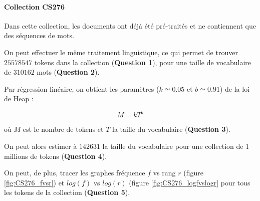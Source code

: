 \documentclass[12pt,a4paper]{article}
\begin{document}
\paragraph{Collection CS276} Dans cette collection, les documents ont déjà été pré-traités et ne contiennent que des séquences de mots.

On peut effectuer le même traitement linguistique, ce qui permet de trouver $25578547$ tokens dans la collection (\textbf{Question 1}), pour une taille de vocabulaire de $310162$ mots (\textbf{Question 2}).

Par régression linéaire, on obtient les paramètres ($k \simeq 0.05$ et $b \simeq 0.91$) de la loi de Heap :

\[ M =  kT^b \]

où $M$ est le nombre de tokens et $T$ la taille du vocabulaire (\textbf{Question 3}).

On peut alors estimer à $142631$ la taille du vocabulaire pour une collection de $1$ millions de tokens (\textbf{Question 4}).

On peut, de plus, tracer les graphes fréquence $f$ vs rang $r$ (figure \ref{fig:CS276_fvsr}) et $log(f)$ vs $log(r)$ (figure \ref{fig:CS276_logfvslogr} pour tous les tokens de la collection (\textbf{Question 5}).
\end{document}
